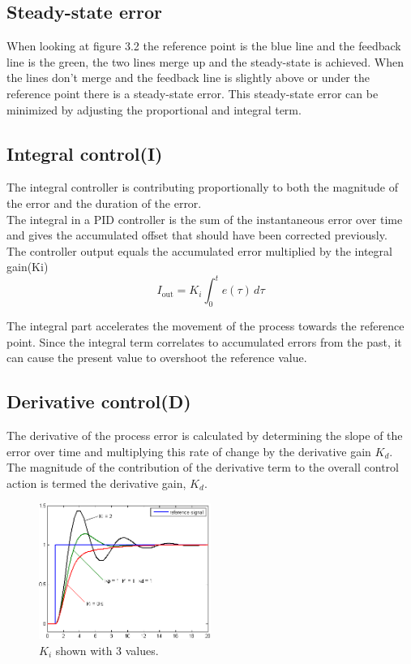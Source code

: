 \subsection {Steady-state error}

When looking at figure 3.2 the reference point is the blue line and the feedback line is the green, the two lines merge up and the steady-state is achieved. When the lines don't merge and the feedback line is slightly above or under the reference point there is a steady-state error. This steady-state error can be minimized by adjusting the proportional and integral term. 

\subsection {Integral control(I)}

The integral controller is contributing proportionally to both the magnitude of the error and the duration of the error. \\
The integral in a PID controller is the sum of the instantaneous error over time and gives the accumulated offset that should have been corrected previously. \\ 

The controller output equals the accumulated error multiplied by the integral gain(Ki)\\
$$I_{\mathrm{out}}=K_{i}\int_{0}^{t}{e(\tau)}\,{d\tau}$$ 

The integral part accelerates the movement of the process towards the reference point.
Since the integral term correlates to accumulated errors from the past, it can cause the present value to overshoot the reference value.

\subsection {Derivative control(D)} 

The derivative of the process error is calculated by determining the slope of the error over time and multiplying this rate of change by the derivative gain $K_d$. The magnitude of the contribution of the derivative term to the overall control action is termed the derivative gain, $K_d$.
\begin{figure}[h!]
  \centering
  \includegraphics[width=0.5\textwidth]{figures/Change_with_Ki.png}
  
  \caption{$K_i$ shown with 3 values.} 
  \label{PID controller}
\end{figure}

